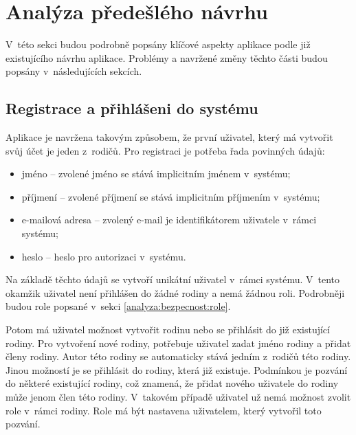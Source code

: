 \section{Analýza předešlého návrhu} \label{analyza:analyza navrhu}
    V~této sekci budou podrobně popsány klíčové aspekty aplikace podle již existujícího návrhu aplikace. Problémy a navržené změny těchto části budou popsány v~následujících sekcích.

    \subsection{Registrace a přihlášeni do systému}
        Aplikace je navržena takovým způsobem, že první uživatel, který má vytvořit svůj účet je jeden z~rodičů. Pro registraci je potřeba řada povinných údajů:
        \begin{itemize}
        \setlength\itemsep{0.3em}
	        \item jméno -- zvolené jméno se stává implicitním jménem v~systému;
	        \item příjmení -- zvolené příjmení se stává implicitním příjmením v~systému;
	        \item e-mailová adresa -- zvolený e-mail je identifikátorem uživatele v~rámci systému;
	        \item heslo -- heslo pro autorizaci v~systému.
        \end{itemize}
        Na základě těchto údajů se vytvoří unikátní uživatel v~rámci systému. V~tento okamžik uživatel není přihlášen do žádné rodiny a nemá žádnou roli. Podrobněji budou role popsané v~sekci \ref{analyza:bezpecnost:role}.
        
        Potom má uživatel možnost vytvořit rodinu nebo se přihlásit do již existující rodiny. Pro vytvoření nové rodiny, potřebuje uživatel zadat jméno rodiny a přidat členy rodiny. Autor této rodiny se automaticky stává jedním z~rodičů této rodiny. Jinou možností je se přihlásit do rodiny, která již existuje. Podmínkou je pozvání do některé existující rodiny, což znamená, že přidat nového uživatele do rodiny může jenom člen této rodiny. V~takovém případě uživatel už nemá možnost zvolit role v~rámci rodiny. Role má být nastavena uživatelem, který vytvořil toto pozvání.

